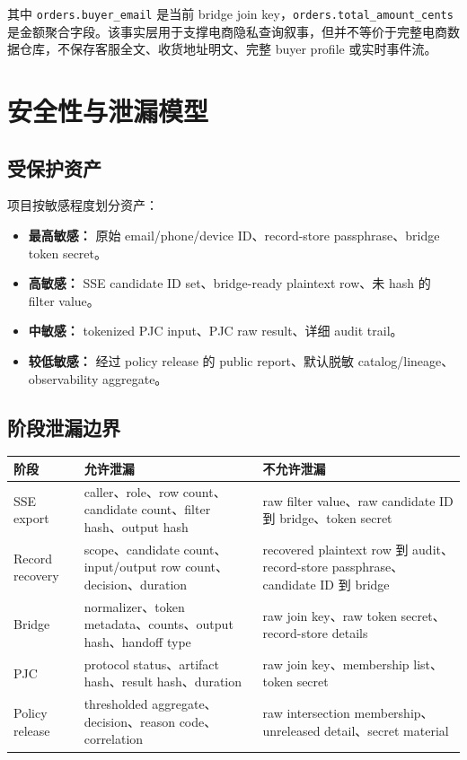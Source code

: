 \documentclass[UTF8,a4paper,12pt,oneside]{ctexrep}
\begin{document}
其中 \texttt{orders.buyer\_email} 是当前 bridge join key，\texttt{orders.total\_amount\_cents} 是金额聚合字段。该事实层用于支撑电商隐私查询叙事，但并不等价于完整电商数据仓库，不保存客服全文、收货地址明文、完整 buyer profile 或实时事件流。

\chapter{安全性与泄漏模型}

\section{受保护资产}

项目按敏感程度划分资产：

\begin{itemize}
  \item \textbf{最高敏感：} 原始 email/phone/device ID、record-store passphrase、bridge token secret。
  \item \textbf{高敏感：} SSE candidate ID set、bridge-ready plaintext row、未 hash 的 filter value。
  \item \textbf{中敏感：} tokenized PJC input、PJC raw result、详细 audit trail。
  \item \textbf{较低敏感：} 经过 policy release 的 public report、默认脱敏 catalog/lineage、observability aggregate。
\end{itemize}

\section{阶段泄漏边界}

\begin{longtable}{p{}p{}p{}}
\toprule
\textbf{阶段} & \textbf{允许泄漏} & \textbf{不允许泄漏} \\
\midrule
SSE export & caller、role、row count、candidate count、filter hash、output hash & raw filter value、raw candidate ID 到 bridge、token secret \\
Record recovery & scope、candidate count、input/output row count、decision、duration & recovered plaintext row 到 audit、record-store passphrase、candidate ID 到 bridge \\
Bridge & normalizer、token metadata、counts、output hash、handoff type & raw join key、raw token secret、record-store details \\
PJC & protocol status、artifact hash、result hash、duration & raw join key、membership list、token secret \\
Policy release & thresholded aggregate、decision、reason code、correlation & raw intersection membership、unreleased detail、secret material \\
\bottomrule
\end{longtable}
\end{document}
